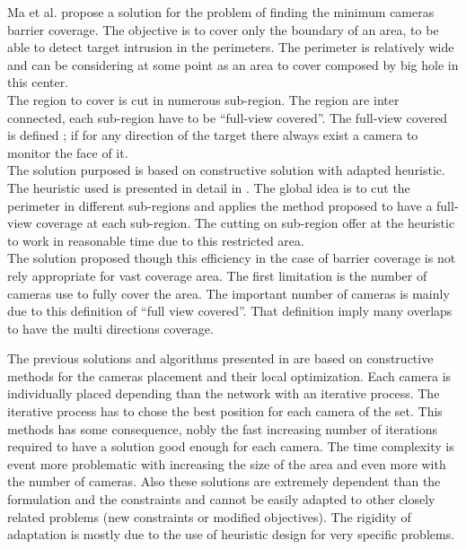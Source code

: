 Ma et al. \cite{37*ma2012} propose a solution for the problem of finding the minimum cameras barrier coverage. The objective is to cover only the boundary of an area, to be able to detect target intrusion in the perimeters. The perimeter is relatively wide and can be considering at some point as an area to cover composed by big hole in this center.\\
 The region to cover is cut in numerous sub-region. The region are inter connected, each sub-region have to be “full-view covered”. The full-view covered is defined ; if for any direction of the target there always exist a camera to monitor the face of it.\\
The solution purposed is based on constructive solution with adapted heuristic. The heuristic used is presented in detail in \cite{37*ma2012}. The global idea is to cut the perimeter in different sub-regions and applies the method proposed to have a full-view coverage at each sub-region. 
The cutting on sub-region offer at the heuristic to work in reasonable time due to this restricted area.\\
The solution proposed though this efficiency in the case of barrier coverage is not rely appropriate for vast coverage area. The first limitation is the number of cameras use to fully cover the area. The important number of cameras is mainly due to this definition of “full view covered”. That definition imply many overlaps to have the multi directions coverage.

The previous solutions and algorithms presented in \cite{38*liu2010, 37*ma2012,81*nikolaidis2009,171*horster2006} are based on constructive methods for the cameras placement and their local optimization. Each camera is individually placed depending than the network with an iterative process. The iterative process has to chose the best position for each camera of the set. This methods has some consequence, nobly the fast increasing number of iterations required to have a solution good enough for each camera. The time complexity is event more problematic with increasing the size of the area and even more with the number of cameras. Also these solutions are extremely dependent than the formulation and the constraints and cannot be easily adapted to other closely related problems (new constraints  or modified objectives). The rigidity of adaptation is mostly due to the  use of heuristic  design for  very specific problems. 

